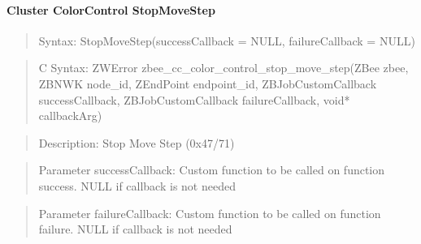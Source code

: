 \paragraph{Cluster ColorControl StopMoveStep}
\begin{quote}Syntax: StopMoveStep(successCallback = NULL, failureCallback = NULL)\end{quote}
\begin{quote}C Syntax: ZWError zbee\_cc\_color\_control\_stop\_move\_step(ZBee zbee, ZBNWK node\_id, ZEndPoint endpoint\_id, ZBJobCustomCallback successCallback, ZBJobCustomCallback failureCallback, void* callbackArg)\end{quote}
\begin{quote}Description: Stop Move Step (0x47/71)\end{quote}
\begin{quote}Parameter successCallback: Custom function to be called on function success. NULL if callback is not needed\end{quote}
\begin{quote}Parameter failureCallback: Custom function to be called on function failure. NULL if callback is not needed\end{quote}


